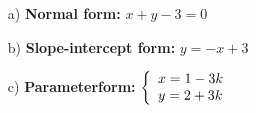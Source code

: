 \begin{itemize}
\item[a) ]
{\bf Normal form: }
$x+y-3=0$
\item[b) ]
{\bf Slope-intercept form: }
$y=-x+3$
\item[c)]
{\bf Parameterform: }
$\left\{
\begin{array}{l l}
    x=1-3k\\
    y=2+3k
\end{array}\right.$
\end{itemize}
